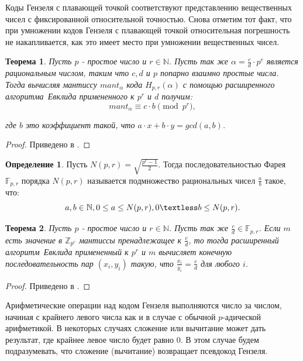 \documentclass[master, och, diploma, times]{sty/SCWorks}
\theoremstyle{plain}
\newtheorem{thethm}{Теорема}[section]
\theoremstyle{definition}
\newtheorem{defn}{Определение}[section]
\begin{document}
Коды Гензеля с плавающей точкой соответствуют представлению вещественных чисел с фиксированной относительной точностью. Снова отметим тот факт, что при умножении кодов Гензеля с плавающей точкой относительная погрешность не накапливается, как это имеет место при умножении вещественных чисел.

\begin{thethm}\label{th:forward_mapping}
Пусть $p$ - простое число и $r \in \mathbb{N}$. Пусть так же $\alpha=\frac{c}{d} \cdot p^e$ является рациональным числом, таким что $c, d$ и $p$ попарно взаимно простые числа. Тогда вычисляя мантиссу $mant_{\alpha}$ кода $H_{p,r}(\alpha)$ с помощью \mbox{расширенного} \mbox{алгоритма Евклида} примененного к $p^r$ и $d$ получим:
\begin{equation}
mant_{\alpha} \equiv c \cdot b \pmod {p^r},
\end{equation}

\noindent где $b$ это коэффициент такой, что $a\cdot x+b\cdot y = gcd(a,b)$.
\end{thethm}


\begin{proof} 
Приведено в \cite{bib:numbers:miola}.
\end{proof}


\begin{defn}\label{def:farey}
Пусть $N(p, r)=\sqrt{\frac{p^r-1}{2}}$. Тогда последовательностью Фарея $\mathbb{F}_{p,r}$ порядка $N(p, r)$ называется подмножество рациональных чисел $\frac{a}{b}$ такое, что:
\begin{equation}
a, b \in \mathbb{N}, 0 \leq a \leq N(p, r), 0 \textless b \leq N(p, r).
\end{equation}
\end{defn}


\begin{thethm}\label{th:backward_mapping}
Пусть $p$ - простое число и $r \in \mathbb{N}$. Пусть так же $\frac{c}{d} \in \mathbb{F}_{p,r}$. Если $m$ есть значение в $\mathbb{Z}_{p^r}$ мантиссы пренадлежащее к $\frac{c}{d}$, то тогда \mbox{расширенный} \mbox{алгоритм Евклида} примененный к $p^r$ и $m$ вычисляет конечную последовательность пар $(x_i, y_i)$ такую, что $\frac{x_i}{y_i}=\frac{c}{d}$ для любого $i$.
\end{thethm}

\begin{proof} 
Приведено в \cite{bib:numbers:miola}.
\end{proof}


Арифметические операции над кодом Гензеля выполняются число за числом, начиная с крайнего левого числа как и в случае с обычной $p$-адической арифметикой. В некоторых случаях сложение или вычитание может дать результат, где крайнее левое число будет равно $0$. В этом случае будем подразумевать, что сложение (вычитание) возвращает псевдокод Гензеля.
\end{document}

